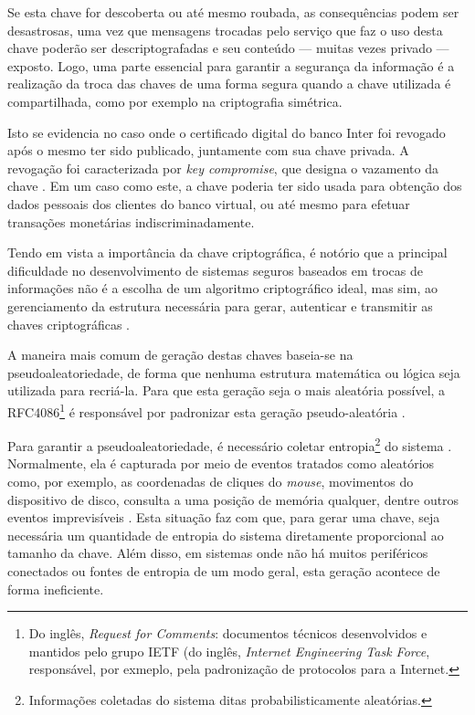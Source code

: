 \documentclass[12pt]{article}
\newcommand{\internet}{Internet\xspace}
\begin{document}
        

        Se esta chave for descoberta ou até mesmo roubada, as consequências podem ser desastrosas, uma vez que mensagens trocadas pelo serviço que faz o uso desta chave poderão ser descriptografadas e seu conteúdo --- muitas vezes privado --- exposto. Logo, uma parte essencial para garantir a segurança da informação é a realização da troca das chaves de uma forma segura quando a chave utilizada é compartilhada, como por exemplo na criptografia simétrica.
    
        Isto se evidencia no caso onde o certificado digital do banco Inter foi revogado após o mesmo ter sido publicado, juntamente com sua chave privada. A revogação foi caracterizada por \textit{key compromise}, que designa o vazamento da chave \cite{rohr2018inter}. Em um caso como este, a chave poderia ter sido usada para obtenção dos dados pessoais dos clientes do banco virtual, ou até mesmo para efetuar transações monetárias indiscriminadamente.
    
        Tendo em vista a importância da chave criptográfica, é notório que a principal dificuldade no desenvolvimento de sistemas seguros baseados em trocas de informações não é a escolha de um algoritmo criptográfico ideal, mas sim, ao gerenciamento da estrutura necessária para gerar, autenticar e transmitir as chaves criptográficas \cite{al2003certificateless}.
    
        A maneira mais comum de geração destas chaves baseia-se na pseudoaleatoriedade, de forma que nenhuma estrutura matemática ou lógica seja utilizada para recriá-la. Para que esta geração seja o mais aleatória possível, a RFC4086\footnote{Do inglês, \textit{Request for Comments}: documentos técnicos desenvolvidos e mantidos pelo grupo IETF (do inglês, \textit{Internet Engineering Task Force}, responsável, por exmeplo, pela padronização de protocolos para a \internet.} é responsável por padronizar esta geração pseudo-aleatória \cite{ntwg2005rfc4086}.
    
        Para garantir a pseudoaleatoriedade, é necessário coletar entropia\footnote{Informações coletadas do sistema ditas probabilisticamente aleatórias.} do sistema \cite{ristenpart2010randomness}. Normalmente, ela é capturada por meio de eventos tratados como aleatórios como, por exemplo, as coordenadas de cliques do \textit{mouse}, movimentos do dispositivo de disco, consulta a uma posição de memória qualquer, dentre outros eventos imprevisíveis \cite{young2004malicious}. Esta situação faz com que, para gerar uma chave, seja necessária um quantidade de entropia do sistema diretamente proporcional ao tamanho da chave. Além disso, em sistemas onde não há muitos periféricos conectados ou fontes de entropia de um modo geral, esta geração acontece de forma ineficiente.
    
\end{document}
